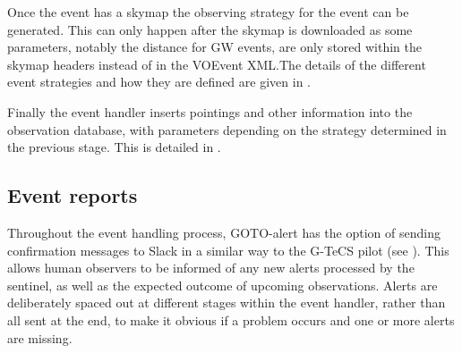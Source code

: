 \begin{colsection}
\begin{colsection}
Once the event has a skymap the observing strategy for the event can be generated. This can only happen after the skymap is downloaded as some parameters, notably the distance for GW events, are only stored within the skymap headers instead of in the VOEvent XML.\@ The details of the different event strategies and how they are defined are given in .

Finally the event handler inserts pointings and other information into the observation database, with parameters depending on the strategy determined in the previous stage. This is detailed in .

\end{colsection}


\newpage
\subsection{Event reports}
\label{sec:event_slack}
\begin{colsection}

Throughout the event handling process, GOTO-alert has the option of sending confirmation messages to Slack in a similar way to the G-TeCS pilot (see ). This allows human observers to be informed of any new alerts processed by the sentinel, as well as the expected outcome of upcoming observations. Alerts are deliberately spaced out at different stages within the event handler, rather than all sent at the end, to make it obvious if a problem occurs and one or more alerts are missing.


\end{colsection}
\end{colsection}
